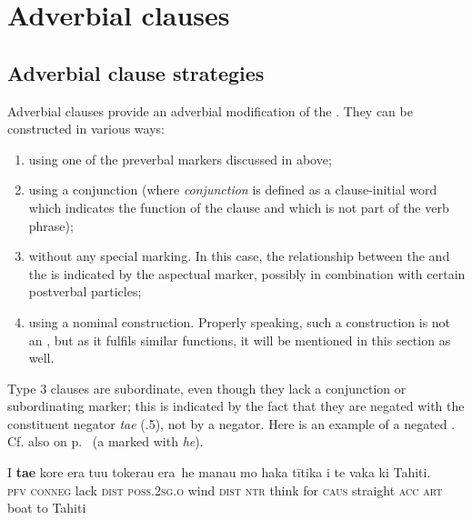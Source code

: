 \section{Adverbial clauses}\label{sec:11.6}
\subsection{Adverbial clause strategies}\label{sec:11.6.1}

Adverbial clauses provide an adverbial modification of the . They can be constructed in various ways:

\begin{enumerate}
\item 
using one of the preverbal markers discussed in  above;

\item 
using a conjunction (where \textit{conjunction} is defined as a clause-initial word which indicates the function of the clause and which is not part of the verb phrase);

\item 
without any special marking. In this case, the relationship between the  and the  is indicated by the aspectual marker, possibly in combination with certain postverbal particles;

\item 
using a nominal construction. Properly speaking, such a construction is not an , but as it fulfils similar functions, it will be mentioned in this section as well.

\end{enumerate}

Type 3 clauses are subordinate, even though they lack a conjunction or subordinating marker; this is indicated by the fact that they are negated with the constituent negator \textit{ta{\ꞌ}e} (.5), not by a  negator. Here is an example of a negated . Cf. also  on p.~\pageref{ex:11.257} (a  marked with \textit{he}).

\ea\label{ex:11.210}
\gll {\ob}I \textbf{ta{\ꞌ}e} kore era tu{\ꞌ}u tokerau era\,{\cb} he mana{\ꞌ}u mo haka tītika  i te vaka ki Tahiti.\\
{\db}\textsc{pfv} \textsc{conneg} lack \textsc{dist} \textsc{poss.2sg.o} wind \textsc{dist} \textsc{ntr} think for \textsc{caus} straight  \textsc{acc} \textsc{art} boat to Tahiti\\

